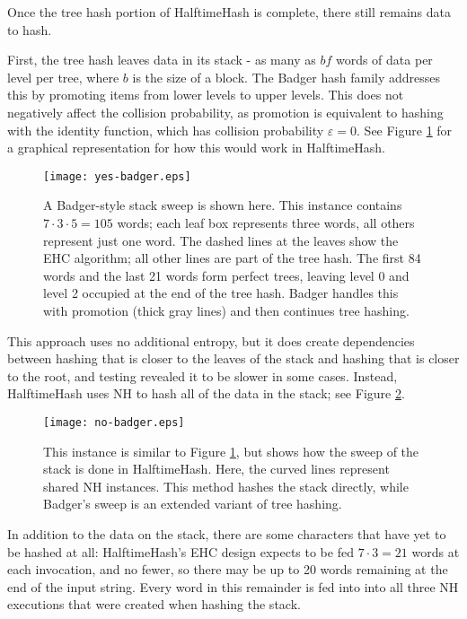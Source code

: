 \documentclass[runningheads]{llncs}
\begin{document}

Once the tree hash portion of HalftimeHash is complete, there still remains data to hash.

First, the tree hash leaves data in its stack - as many as $bf$ words of data per level per tree, where $b$ is the size of a block.
The Badger hash family addresses this by promoting items from lower levels to upper levels.
This does not negatively affect the collision probability, as promotion is equivalent to hashing with the identity function, which has collision probability $\varepsilon = 0$.
See Figure \ref{yes-badger} for a graphical representation for how this would work in HalftimeHash.

\begin{figure}
\texttt{[image: yes-badger.eps]}
\caption{\label{yes-badger}
  A Badger-style stack sweep is shown here.
  This instance contains $7 \cdot 3 \cdot 5 = 105$ words; each leaf box represents three words, all others represent just one word.
  The dashed lines at the leaves show the EHC algorithm; all other lines are part of the tree hash.
  The first 84 words and the last 21 words form perfect trees, leaving level 0 and level 2 occupied at the end of the tree hash.
  Badger handles this with promotion (thick gray lines) and then continues tree hashing. \cite{badger}
}
\end{figure}

This approach uses no additional entropy, but it does create dependencies between hashing that is closer to the leaves of the stack and hashing that is closer to the root, and testing revealed it to be slower in some cases.
Instead, HalftimeHash uses NH to hash all of the data in the stack; see Figure \ref{no-badger}.

\begin{figure}
\texttt{[image: no-badger.eps]}
\caption{\label{no-badger}
  This instance is similar to Figure \ref{yes-badger}, but shows how the sweep of the stack is done in HalftimeHash.
  Here, the curved lines represent shared NH instances.
  This method hashes the stack directly, while Badger's sweep is an extended variant of tree hashing.
}
\end{figure}


In addition to the data on the stack, there are some characters that have yet to be hashed at all: HalftimeHash's EHC design expects to be fed $7 \cdot 3 = 21$ words at each invocation, and no fewer, so there may be up to 20 words remaining at the end of the input string.
Every word in this remainder is fed into into all three NH executions that were created when hashing the stack.
\end{document}
